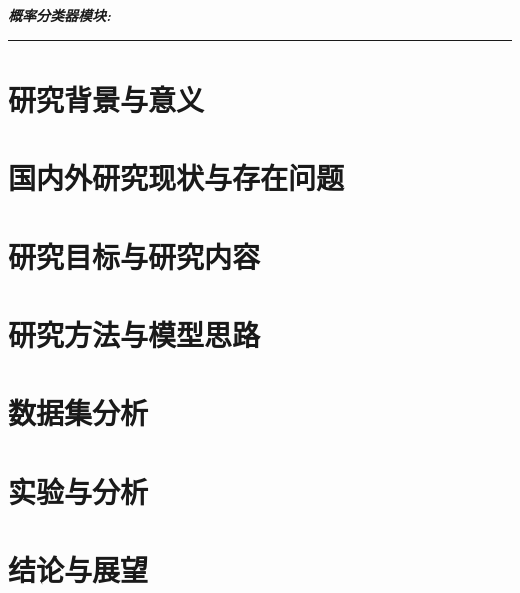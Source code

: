 \documentclass[11pt]{article}
\begin{document}
\noindent \textit{\bfseries \songti 概率分类器模块:}\\[1mm]
\rule[1em]{30em}{0.5pt}


% 




\newpage
\tableofcontents
\thispagestyle{empty}%


\newpage
\setcounter{page}{1}%
\section{研究背景与意义}


\newpage
\section{国内外研究现状与存在问题}


\newpage
\section{研究目标与研究内容}


\newpage
\section{研究方法与模型思路}


\newpage
\section{数据集分析}


\newpage
\section{实验与分析}


\newpage
\section{结论与展望}



%     

\newpage
\end{document}
